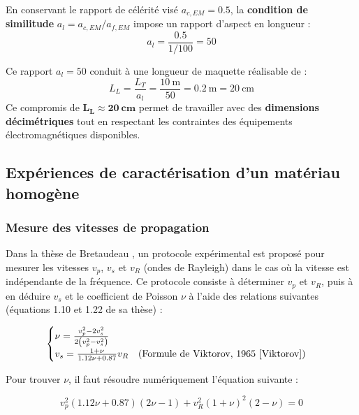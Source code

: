 En conservant le rapport de célérité visé $a_{c,EM} = 0.5$, la \textbf{condition de similitude} $a_l = a_{c,EM} / a_{f,EM}$ impose un rapport d'aspect en longueur :
\begin{equation}
    a_l = \frac{0.5}{1/100} = 50
\end{equation}

Ce rapport $a_l = 50$ conduit à une longueur de maquette réalisable de :
\begin{equation}
    L_L = \frac{L_T}{a_l} = \frac{10~\text{m}}{50} = 0.2~\text{m} = 20~\text{cm}
\end{equation}
Ce compromis de $\mathbf{L_L \approx 20~\text{cm}}$ permet de travailler avec des \textbf{dimensions décimétriques} tout en respectant les contraintes des équipements électromagnétiques disponibles.

\subsection{Expériences de caractérisation d'un matériau homogène}
\subsubsection{Mesure des vitesses de propagation}

Dans la thèse de Bretaudeau \cite{bretaudeau}, un protocole expérimental est proposé pour mesurer les vitesses $v_p$, $v_s$ et $v_R$ (ondes de Rayleigh) dans le cas où la vitesse est indépendante de la fréquence. Ce protocole consiste à déterminer $v_p$ et $v_R$, puis à en déduire $v_s$ et le coefficient de Poisson $\nu$ à l’aide des relations suivantes (équations 1.10 et 1.22 de sa thèse) :

\begin{equation}
    \begin{cases}
         \nu = \frac{v_p^2 - 2v_s^2}{2\left( v_p^2 - v_s^2 \right)} \\
         v_s = \frac{1 + \nu}{1.12\nu + 0.87} v_R \quad \text{(Formule de Viktorov, 1965 \cite{Viktorov})}
    \end{cases}
    \label{eq:exp:nu_vs}
\end{equation}

Pour trouver $\nu$, il faut résoudre numériquement l’équation suivante :

\begin{equation}
    v_p^2(1.12\nu + 0.87)(2\nu - 1) + v_R^2(1 + \nu)^2(2 - \nu) = 0
\end{equation}

